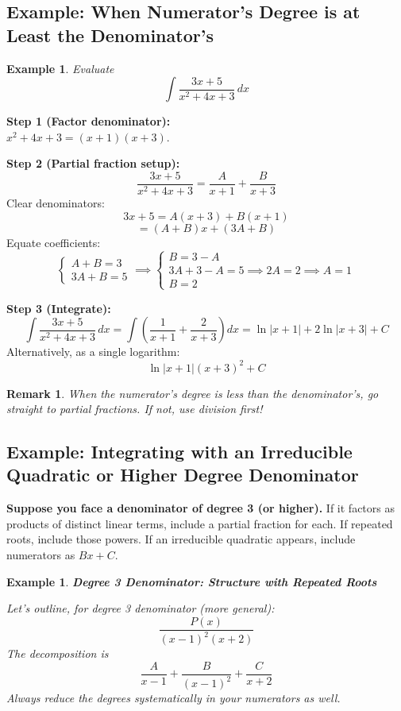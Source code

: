 \documentclass[12pt]{article}
\newtheorem{example}[definition]{Example}
\newtheorem{remark}[definition]{Remark}
\begin{document}
\subsection{Example: When Numerator’s Degree is at Least the Denominator's}

\begin{example}
Evaluate
\[
\int \frac{3x + 5}{x^2 + 4x + 3}\, dx
\]
\end{example}
\textbf{Step 1 (Factor denominator):}\\
\(x^2 + 4x + 3 = (x+1)(x+3)\).

\textbf{Step 2 (Partial fraction setup):}
\[
\frac{3x + 5}{x^2 + 4x + 3} = \frac{A}{x + 1} + \frac{B}{x + 3}
\]
Clear denominators:
\[
3x + 5 = A(x+3) + B(x+1)
\]
\[
= (A+B)x + (3A + B)
\]
Equate coefficients:
\[
\begin{cases}
A + B = 3 \\
3A + B = 5
\end{cases}
\implies
\begin{cases}
B = 3 - A\\
3A + 3 - A = 5 \implies 2A = 2 \implies A = 1\\
B = 2
\end{cases}
\]

\textbf{Step 3 (Integrate):}
\[
\int \frac{3x + 5}{x^2 + 4x + 3}\, dx = \int \left( \frac{1}{x+1} + \frac{2}{x+3} \right) dx = \ln|x+1| + 2\ln|x+3| + C
\]
Alternatively, as a single logarithm:
\[
\ln|x+1|(x+3)^2 + C
\]

\begin{remark}
When the numerator’s degree is less than the denominator’s, go straight to partial fractions. If not, use division first!
\end{remark}

\subsection{Example: Integrating with an Irreducible Quadratic or Higher Degree Denominator}

\textbf{Suppose you face a denominator of degree 3 (or higher).} If it factors as products of distinct linear terms, include a partial fraction for each. If repeated roots, include those powers. If an irreducible quadratic appears, include numerators as $Bx+C$.

\vspace{1ex}
\begin{example}
\textbf{Degree 3 Denominator: Structure with Repeated Roots}

Let’s outline, for degree 3 denominator (more general):
\[
\frac{P(x)}{(x-1)^2 (x+2)}
\]
The decomposition is
\[
\frac{A}{x-1} + \frac{B}{(x-1)^2} + \frac{C}{x+2}
\]
Always reduce the degrees systematically in your numerators as well.
\end{example}
\end{document}
